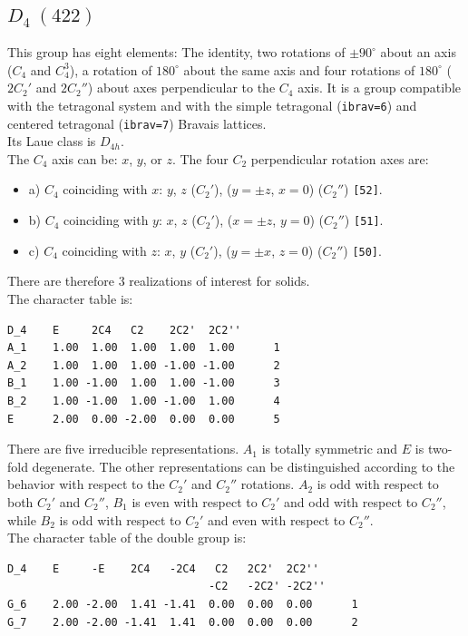 \documentclass[12pt,a4paper]{article}
\begin{document}
\subsection{\color{web-blue}$D_4\ (422)$} 
This group has eight elements: The identity, two rotations of 
$\pm90^\circ$ about
an axis ($C_4$ and $C_4^3$), a rotation of $180^\circ$ about the same axis and
four rotations of $180^\circ$ ($2C_2'$ and $2C_2''$) about axes perpendicular 
to the $C_4$ axis. It is a group compatible with the tetragonal system and with the
simple tetragonal (\texttt{ibrav=6}) and centered tetragonal (\texttt{ibrav=7})
Bravais lattices. \\ 
Its Laue class is $D_{4h}$. \\
The $C_4$ axis can be: $x$, $y$, or $z$. The four $C_2$ perpendicular rotation
axes are: 
\begin{itemize}
\item
a) $C_4$ coinciding with $x$: $y$, $z$ ($C_2'$), ($y=\pm z$, $x=0$) ($C_2''$)
\texttt{[52]}.
\item
b) $C_4$ coinciding with $y$: $x$, $z$ ($C_2'$), ($x=\pm z$, $y=0$) ($C_2''$)
\texttt{[51]}.
\item
c) $C_4$ coinciding with $z$: $x$, $y$ ($C_2'$), ($y=\pm x$, $z=0$) ($C_2''$)
\texttt{[50]}.
\end{itemize}
There are therefore $3$ realizations of interest for solids. \\
The character table is:
\begin{verbatim}
D_4    E     2C4   C2    2C2'  2C2''
A_1    1.00  1.00  1.00  1.00  1.00      1
A_2    1.00  1.00  1.00 -1.00 -1.00      2
B_1    1.00 -1.00  1.00  1.00 -1.00      3
B_2    1.00 -1.00  1.00 -1.00  1.00      4
E      2.00  0.00 -2.00  0.00  0.00      5
\end{verbatim}
There are five irreducible representations. $A_1$ is totally symmetric 
and $E$ is two-fold degenerate. The other representations can be distinguished
according to the behavior with respect to the $C_2'$ and $C_2''$ rotations.
$A_2$ is odd with respect to both $C_2'$ and $C_2''$, $B_1$ is even with respect
to $C_2'$ and odd with respect to $C_2''$, while $B_2$ is odd with respect to
$C_2'$ and even with respect to $C_2''$. \\ 
The character table of the double group is:
\begin{verbatim}
D_4    E     -E    2C4   -2C4   C2   2C2'  2C2''
                               -C2   -2C2' -2C2''
G_6    2.00 -2.00  1.41 -1.41  0.00  0.00  0.00      1
G_7    2.00 -2.00 -1.41  1.41  0.00  0.00  0.00      2
\end{verbatim}
\end{document}
